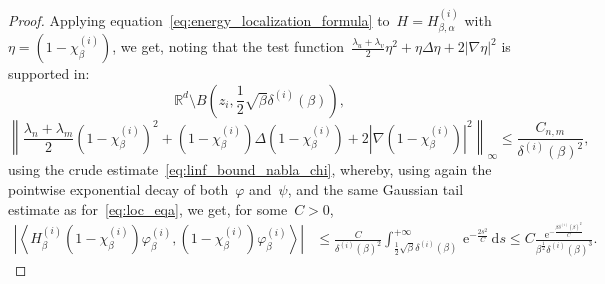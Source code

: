 \documentclass[10pt]{article}
\renewcommand{\d}{\mathrm{d}}
\newcommand{\e}{\mathrm{e}}
\newcommand{\R}{\mathbb{R}}
\newcommand{\1}{\mathbbm 1}
\newcommand{\deltai}{\delta^{(i)}}
\begin{document}
\begin{proof}
        Applying equation~\eqref{eq:energy_localization_formula} to~$H = H_{\beta,\alpha}^{(i)}$ with~$\eta = (1-\chi_\beta^{(i)})$, we get, noting that the test function~$\frac{\lambda_u+\lambda_v}2\eta^2+\eta\Delta\eta + 2|\nabla\eta|^2$ is supported in:
        \[\R^d\setminus B\left(z_i,\frac12\sqrt\beta\deltai(\beta)\right),\]
        \[\left\|\frac{\lambda_n+\lambda_m}{2}(1-\chi_\beta^{(i)})^2+(1-\chi_\beta^{(i)})\Delta(1-\chi_\beta^{(i)}) + 2|\nabla(1-\chi_\beta^{(i)})|^2\right\|_{\infty}\leq \frac{C_{n,m}}{\deltai(\beta)^2},\]
        using the crude estimate~\eqref{eq:linf_bound_nabla_chi}, whereby, using again the pointwise exponential decay of both~$\varphi$ and~$\psi$, and the same Gaussian tail estimate as for~\eqref{eq:loc_eqa}, we get, for some~$C>0$,
        \begin{equation}
            \begin{aligned}
                \left|\left\langle H_\beta^{(i)}(1-\chi_\beta^{(i)})\varphi_\beta^{(i)},(1-\chi_\beta^{(i)})\varphi_\beta^{(i)}\right\rangle \right| &\leq \frac{C}{\deltai(\beta)^2}\int_{\frac12\sqrt\beta\deltai(\beta)}^{+\infty}\,\e^{-\frac{2s^2}{C}}\,\d s\leq C\frac{\e^{-\frac{\beta\deltai(\beta)^2}{C}}}{\beta^{\frac12}\delta^{(i)}(\beta)^3}.
            \end{aligned}
        \end{equation}
    \end{proof}
\end{document}

